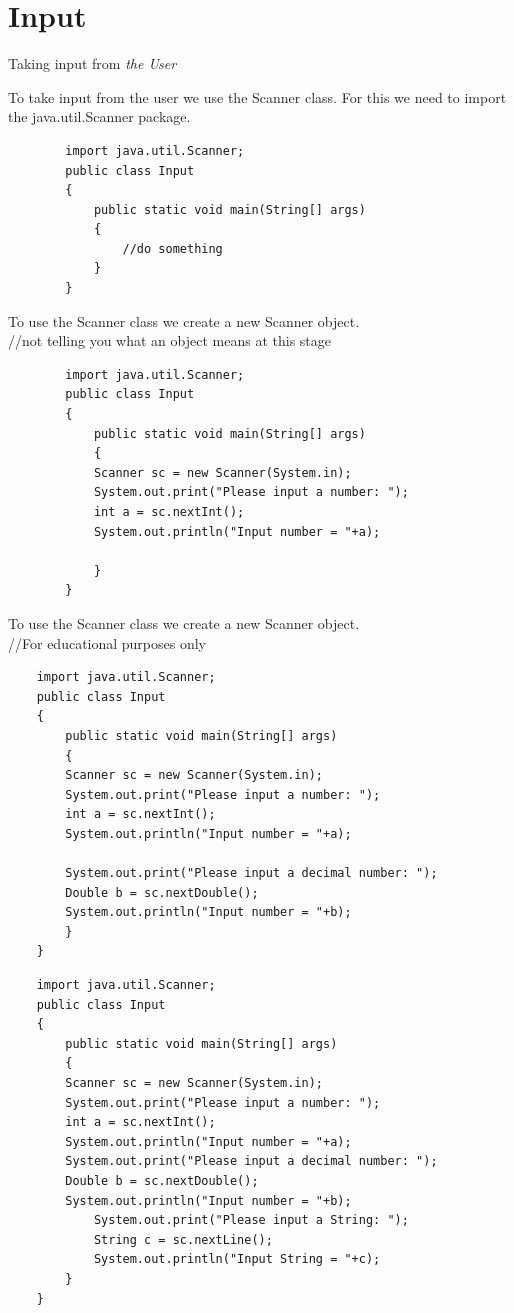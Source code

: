 \section{Input}
\begin{frame}{Taking input from \emph{the User} }
	
	To take input from the user we use the Scanner class. 
	For this we need to import the java.util.Scanner package. 
	
	\begin{lstlisting}
		import java.util.Scanner; 
		public class Input
		{
			public static void main(String[] args)
			{
				//do something
			}
		}
	\end{lstlisting}
\framebreak

	To use the Scanner class we create a new Scanner object.\\
	//not telling you what an object means at this stage
	
	\begin{lstlisting}
		import java.util.Scanner; 
		public class Input
		{
			public static void main(String[] args)
			{
			Scanner sc = new Scanner(System.in);
			System.out.print("Please input a number: ");
			int a = sc.nextInt();
			System.out.println("Input number = "+a);
				
			}
		}
	\end{lstlisting}

\framebreak

To use the Scanner class we create a new Scanner object.\\
//For educational purposes only

\begin{lstlisting}
	import java.util.Scanner; 
	public class Input
	{
		public static void main(String[] args)
		{
		Scanner sc = new Scanner(System.in);
		System.out.print("Please input a number: ");
		int a = sc.nextInt();
		System.out.println("Input number = "+a);
		
		System.out.print("Please input a decimal number: ");
		Double b = sc.nextDouble();
		System.out.println("Input number = "+b);
		}
	}
\end{lstlisting}

\framebreak

\begin{lstlisting}
	import java.util.Scanner; 
	public class Input
	{
		public static void main(String[] args)
		{
		Scanner sc = new Scanner(System.in);
		System.out.print("Please input a number: ");
		int a = sc.nextInt();
		System.out.println("Input number = "+a);
		System.out.print("Please input a decimal number: ");
		Double b = sc.nextDouble();
		System.out.println("Input number = "+b);
			System.out.print("Please input a String: ");
			String c = sc.nextLine();
			System.out.println("Input String = "+c);	
		}
	}
\end{lstlisting}

\end{frame}



